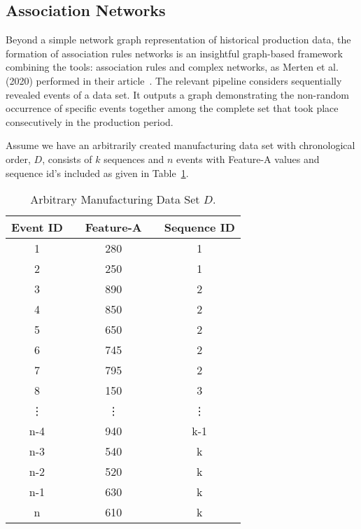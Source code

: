 \subsection*{Association Networks}
%
{\color{red}Beyond a simple network graph representation of historical production data, the formation of association rules networks is an insightful graph-based framework combining the tools: association rules and complex networks, as Merten et al. (2020) performed in their article~\cite{MERTEN2020}. The relevant pipeline considers sequentially revealed events of a data set.} It outputs a graph demonstrating the non-random occurrence of specific events together among the complete set that took place consecutively in the production period.

Assume we have an arbitrarily created manufacturing data set with chronological order, $D$, consists of $k$ sequences and $n$ events with Feature-A values and sequence id's included as given in Table~\ref{Tab:D-dataset}.
\renewcommand{\arraystretch}{1.1}
\begin{table}[ht!]
	\centering
	\setlength{\arrayrulewidth}{0.75pt}%
	\begin{tabular}{|c|ccc|c|}
		\hline \rowcolor[HTML]{FFFFC7}
		Event ID && Feature-A && Sequence ID   \\ \hline
		1 	      && 280  	&& 1 		   	  \\
		2 		  && 250	&& 1 		   	  \\
		3 	      && 890	&& 2 		      \\
		4 		  && 850	&& 2 		      \\
		5 	      && 650	&& 2   		      \\
		6 	      && 745	&& 2 		      \\
		7 		  && 795	&& 2 		      \\
		8 		  && 150	&& 3 		      \\
		\vdots	  && \vdots && \vdots 	      \\
		n-4 	  && 940  	&& k-1	 	      \\
		n-3 	  && 540  	&& k			  \\
		n-2 	  && 520	&& k 		      \\
		n-1       && 630	&& k 		      \\
		n 		  && 610	&& k 		      \\ \hline
	\end{tabular}
	\caption{Arbitrary Manufacturing Data Set $D$.}
	\label{Tab:D-dataset}
\end{table}


